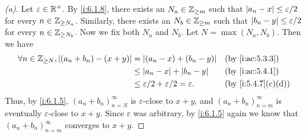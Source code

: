 \begin{proof}[(a)]
  Let \(\varepsilon \in \mathbb{R}^+\).
  By \cref{i:6.1.8}, there exists an \(N_a \in \mathbb{Z}_{\geq m}\) such that \(\left\lvert a_n - x\right\rvert \leq \varepsilon / 2\) for every \(n \in \mathbb{Z}_{\geq N_a}\).
  Similarly, there exists an \(N_b \in \mathbb{Z}_{\geq m}\) such that \(\left\lvert b_n - y\right\rvert \leq \varepsilon / 2\) for every \(n \in \mathbb{Z}_{\geq N_b}\).
  Now we fix both \(N_a\) and \(N_b\).
  Let \(N = \max(N_a, N_b)\).
  Then we have
  \begin{align*}
    \forall n \in \Z_{\geq N}, \abs{(a_n + b_n) - (x + y)} & = \abs{(a_n - x) + (b_n - y)}                         &  & \by{i:ac:5.3.3}   \\
                                                           & \leq \abs{a_n - x} + \abs{b_n - y}                    &  & \by{i:ac:5.4.1}   \\
                                                           & \leq \varepsilon / 2 + \varepsilon / 2 = \varepsilon. &  & \by{i:5.4.7}[c,d]
  \end{align*}
  Thus, by \cref{i:6.1.5}, \((a_n + b_n)_{n = N}^\infty\) is \(\varepsilon\)-close to \(x + y\), and \((a_n + b_n)_{n = m}^\infty\) is eventually \(\varepsilon\)-close to \(x + y\).
  Since \(\varepsilon\) was arbitrary, by \cref{i:6.1.5} again we know that \((a_n + b_n)_{n = m}^\infty\) converges to \(x + y\).
\end{proof}

